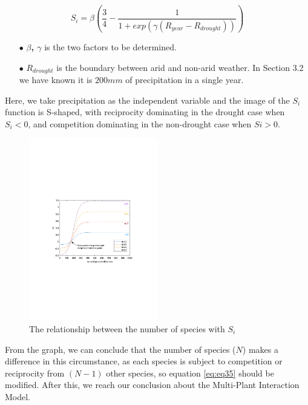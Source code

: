\documentclass[12pt]{article}  %
\newenvironment{shrinkeq}[1]
{ \bgroup
	\addtolength\abovedisplayshortskip{#1}
	\addtolength\abovedisplayskip{#1}
	\addtolength\belowdisplayshortskip{#1}
	\addtolength\belowdisplayskip{#1}}
{\egroup\ignorespacesafterend}
\begin{document}
\newpage
\begin{shrinkeq}{-1ex}
	\begin{equation}
    \label{eq:eq35}
	  S_i = \beta (\frac{3}{4}-\frac{1}{1+exp(\gamma(R_{year}-R_{drought}))})
	\end{equation}
\end{shrinkeq}

\begin{itemize}
\vspace{-0.2cm}
\item[$\bullet$] \textbf{$\beta$, $\gamma$} is the two factors to be determined. 

\vspace{-0.2cm}
\item[$\bullet$] \textbf{$R_{drought}$} is the boundary between arid and non-arid weather. In Section 3.2 we have known it is $200mm$ of precipitation in a single year.
\end{itemize}

\vspace{-0.5cm}
Here, we take precipitation as the independent variable and the image of the $S_i$ function is S-shaped, with reciprocity dominating in the drought case when $S_i < 0$, and competition dominating in the non-drought case when $Si > 0$. 

\begin{figure}[htbp]
	\centering
	\includegraphics[width=0.5\textwidth]{easymcm/img/Si-Ryear.pdf}
	\caption{The relationship between the number of species with $S_i$}
 \label{fig:si}
\end{figure}

\vspace{-0.3cm}
From the graph, we can conclude that the number of species ($N$) makes a difference in this circumstance, as each species is subject to competition or reciprocity from $(N-1)$ other species, so equation \eqref{eq:eq35} should be modified. After this, we reach our conclusion about the Multi-Plant Interaction Model.
\end{document}
